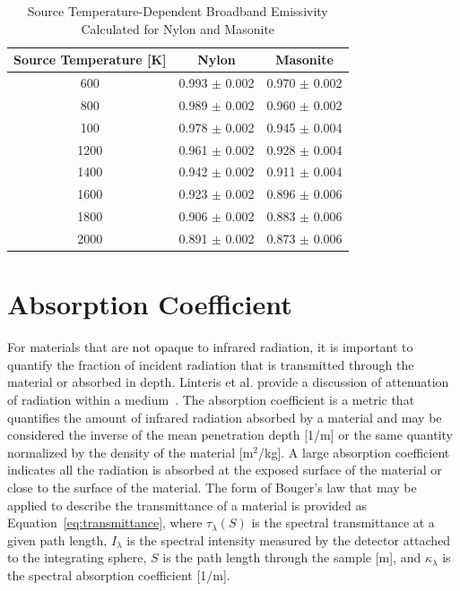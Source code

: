 \documentclass[12pt,oneside]{book}
\begin{document}
\begin{table}[!ht]{}
\centering
\caption[Source Temperature-Dependent Broadband Emissivity]{Source Temperature-Dependent Broadband Emissivity Calculated for Nylon and Masonite}
{\begin{tabular}{ccc}
\toprule
Source Temperature [K]	& Nylon						& Masonite					\\
\midrule
600						& 0.993 $\pm$ 0.002			& 0.970 $\pm$ 0.002			\\ 
800						& 0.989 $\pm$ 0.002			& 0.960 $\pm$ 0.002			\\
100						& 0.978 $\pm$ 0.002			& 0.945 $\pm$ 0.004			\\
1200					& 0.961 $\pm$ 0.002			& 0.928 $\pm$ 0.004			\\ 
1400					& 0.942 $\pm$ 0.002			& 0.911 $\pm$ 0.004			\\
1600					& 0.923 $\pm$ 0.002			& 0.896 $\pm$ 0.006			\\
1800					& 0.906 $\pm$ 0.002			& 0.883 $\pm$ 0.006			\\ 
2000					& 0.891 $\pm$ 0.002			& 0.873 $\pm$ 0.006			\\
\bottomrule
\end{tabular}}
\label{tab:nylon_emissivity}
\end{table}

\section{Absorption Coefficient}

For materials that are not opaque to infrared radiation, it is important to quantify the fraction of incident radiation that is transmitted through the material or absorbed in depth. Linteris et al. provide a discussion of attenuation of radiation within a medium~\cite{Linteris:2011}. The absorption coefficient is a metric that quantifies the amount of infrared radiation absorbed by a material and may be considered the inverse of the mean penetration depth [1/m] or the same quantity normalized by the density of the material [m$^2$/kg]. A large absorption coefficient indicates all the radiation is absorbed at the exposed surface of the material or close to the surface of the material. The form of Bouger's law that may be applied to describe the transmittance of a material is provided as Equation~\ref{eq:transmittance}, where $\tau_\lambda(S)$ is the spectral transmittance at a given path length, $I_\lambda$ is the spectral intensity measured by the detector attached to the integrating sphere, $S$ is the path length through the sample [m], and $\kappa_\lambda$ is the spectral absorption coefficient [1/m].
\end{document}
